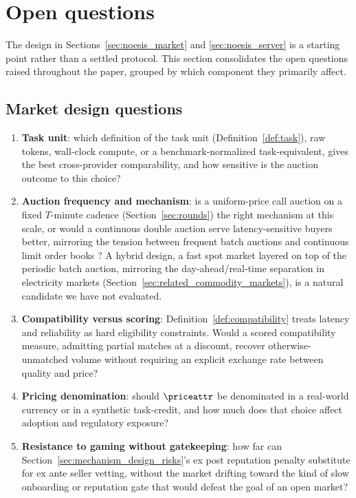 \section{Open questions}
\label{sec:open_questions}

The design in Sections~\ref{sec:noesis_market} and \ref{sec:noesis_server}
is a starting point rather than a settled protocol. This section
consolidates the open questions raised throughout the paper, grouped by
which component they primarily affect.

\subsection{Market design questions}
\label{sec:open_questions_market}

\begin{enumerate}
  \item \textbf{Task unit}: which definition of the task unit
    (Definition~\ref{def:task}), raw tokens, wall-clock compute, or a
    benchmark-normalized task-equivalent, gives the best cross-provider
    comparability, and how sensitive is the auction outcome to this
    choice?

  \item \textbf{Auction frequency and mechanism}: is a uniform-price call
    auction on a fixed $T$-minute cadence
    (Section~\ref{sec:rounds}) the right mechanism at this scale, or would
    a continuous double auction serve latency-sensitive buyers better,
    mirroring the tension between frequent batch auctions and continuous
    limit order books \cite{budish2015}? A hybrid design, a fast spot
    market layered on top of the periodic batch auction, mirroring the
    day-ahead/real-time separation in electricity markets
    (Section~\ref{sec:related_commodity_markets}), is a natural candidate
    we have not evaluated.

  \item \textbf{Compatibility versus scoring}: Definition~\ref{def:compatibility}
    treats latency and reliability as hard eligibility constraints. Would
    a scored compatibility measure, admitting partial matches at a
    discount, recover otherwise-unmatched volume without requiring an
    explicit exchange rate between quality and price?

  \item \textbf{Pricing denomination}: should $\priceattr$ be denominated
    in a real-world currency or in a synthetic task-credit, and how much
    does that choice affect adoption and regulatory exposure?

  \item \textbf{Resistance to gaming without gatekeeping}: how far can
    Section~\ref{sec:mechanism_design_risks}'s ex post reputation penalty
    substitute for ex ante seller vetting, without the market drifting
    toward the kind of slow onboarding or reputation gate that would
    defeat the goal of an open market?
\end{enumerate}

